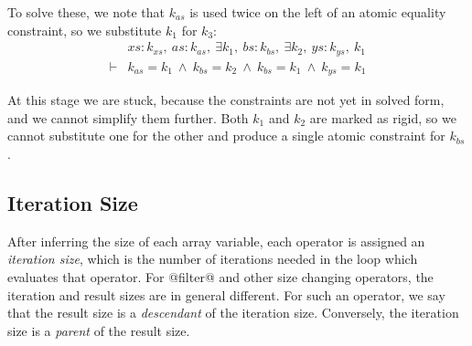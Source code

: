 To solve these, we note that $k_{as}$ is used twice on the left of an atomic equality constraint, so we substitute $k_1$ for $k_3$:
$$
\begin{array}{ll}
       & xs : k_{xs},~ as : k_{as},~ \exists k_1,~ bs : k_{bs},~ \exists k_2,~ ys : k_{ys},~ k_1
\\
\vdash &          k_{as}   = k_1
        ~\wedge~  k_{bs}   = k_2
        ~\wedge~  k_{bs}   = k_1
        ~\wedge~  k_{ys}   = k_1
\end{array}
$$

At this stage we are stuck, because the constraints are not yet in solved form, and we cannot simplify them further. Both $k_1$ and $k_2$ are marked as rigid, so we cannot substitute one for the other and produce a single atomic constraint for $k_{bs}$.


% 

% 


\subsection{Iteration Size}
After inferring the size of each array variable, each operator is assigned an \emph{iteration size}, which is the number of iterations needed in the loop which evaluates that operator. For @filter@ and other size changing operators, the iteration and result sizes are in general different. For such an operator, we say that the result size is a \emph{descendant} of the iteration size. Conversely, the iteration size is a \emph{parent} of the result size. 

